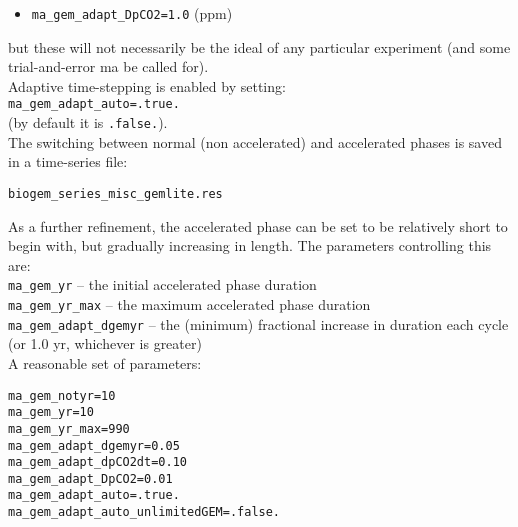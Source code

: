 \documentclass[11pt,fleqn]{book} %
\begin{document}
\begin{enumerate}
\begin{itemize}
\vspace{1mm}
        \item \texttt{ma\_gem\_adapt\_DpCO2=1.0} (ppm)
\end{itemize}
but these will not necessarily be the ideal of any particular experiment (and some trial-and-error ma be called for).
\\Adaptive time-stepping is enabled by setting:
\\\texttt{ma\_gem\_adapt\_auto=.true.}
\\(by default it is \texttt{.false.}).
\\The switching between normal (non accelerated) and accelerated phases is saved in a time-series file:
\vspace{-1mm}\begin{verbatim}biogem_series_misc_gemlite.res\end{verbatim}\vspace{-1mm}

As a further refinement, the accelerated phase can be set to be relatively short to begin with, but gradually increasing in length. The parameters controlling this are:
\\\texttt{ma\_gem\_yr} -- the initial accelerated phase duration
\\\texttt{ma\_gem\_yr\_max} -- the maximum accelerated phase duration
\\\texttt{ma\_gem\_adapt\_dgemyr} -- the (minimum) fractional increase in duration each cycle (or 1.0 yr, whichever is greater)
\\ A reasonable set of parameters:
\vspace{-1mm}\begin{verbatim}
ma_gem_notyr=10
ma_gem_yr=10
ma_gem_yr_max=990
ma_gem_adapt_dgemyr=0.05
ma_gem_adapt_dpCO2dt=0.10
ma_gem_adapt_DpCO2=0.01
ma_gem_adapt_auto=.true.
ma_gem_adapt_auto_unlimitedGEM=.false.
\end{verbatim}\vspace{-1mm}
        
\end{enumerate}
\vspace{2mm}
\end{document}
